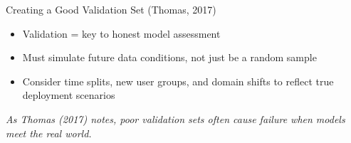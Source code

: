 \documentclass[aspectratio=169]{beamer}
\begin{document}

\begin{frame}{Creating a Good Validation Set (Thomas, 2017)}
\begin{itemize}
\item Validation = key to honest model assessment
\item Must simulate future data conditions, not just be a random sample
\item Consider time splits, new user groups, and domain shifts to reflect true deployment scenarios
\end{itemize}

\emph{As Thomas (2017) notes, poor validation sets often cause failure when models meet the real world.}
\end{frame}

%
\end{document}
